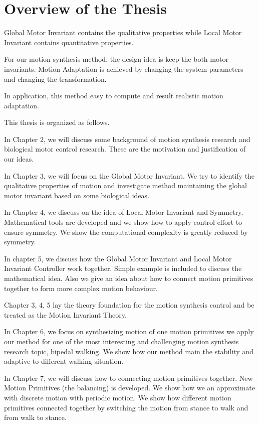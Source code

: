 \section{Overview of the Thesis}
Global Motor Invariant contains the qualitative properties while Local Motor Invariant contains quantitative properties. 

For our motion synthesis method, the design idea is keep the both motor invariants. Motion Adaptation is achieved by changing the system parameters and changing the transformation.

In application, this method easy to compute and result realistic motion adaptation.



This thesis is organized as follows.
 
In Chapter 2, we will discuss some background of motion synthesis research and biological motor control research. These are the motivation and justification of our ideas.
 
In Chapter 3, we will focus on the Global Motor Invariant. We try to identify the qualitative properties of motion and investigate method maintaining the global motor invariant based on some biological ideas.

In Chapter 4, we discuss on the idea of Local Motor Invariant and Symmetry.
Mathematical tools are developed and we show how to apply control effort to ensure symmetry. We show the computational complexity is greatly reduced by symmetry.

In chapter 5, we discuss how the Global Motor Invariant and Local Motor Invariant Controller work together. Simple example is included to discuss the mathematical idea. Also we give an idea about how to connect motion primitives together to form more complex motion behaviour.

Chapter 3, 4, 5 lay the theory foundation for the motion synthesis control and be treated as the Motion Invariant Theory.

In Chapter 6, we focus on synthesizing motion of one motion primitives
 we apply our method for one of the most interesting and challenging motion synthesis research topic, bipedal walking. We show how our method main the stability and adaptive to different walking situation.


In Chapter 7, we will discuss how to connecting motion primitives together.
New Motion Primitives (the balancing) is developed. We show how we an approximate with discrete motion with periodic motion. We show how different motion primitives connected together by switching the motion from stance to walk and from walk to stance.

